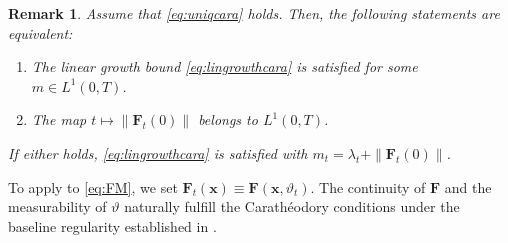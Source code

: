 \documentclass[twoside,11pt]{article}
\theoremstyle{plain}
\newtheorem{lemma}[theorem]{Lemma}
\newtheorem{remark}[theorem]{Remark}
\newcommand{\diff}{\mathrm{d}}
\newcommand{\bfF}{\mathbf{F}}
\newcommand{\bfx}{\mathbf{x}}
\begin{document}
\begin{remark}\label{rema2}
Assume that \eqref{eq:uniqcara} holds. Then, the following statements are equivalent: 
\begin{enumerate}
    \item The linear growth bound \eqref{eq:lingrowthcara} is satisfied for some $m \in L^1(0,T)$.
    \item The map $t\mapsto\|\mathbf{F}_t(0)\|$ belongs to $L^1(0,T)$.  
\end{enumerate}
If either holds, \eqref{eq:lingrowthcara} is satisfied with $m_t=\lambda_t+\|\mathbf{F}_t(0)\|$.
\end{remark} 

To apply  to \eqref{eq:FM}, we set $\mathbf{F}_t(\bfx)\equiv\bfF(\bfx,\vartheta_t)$. The continuity of $\bfF$ and the measurability of $\vartheta$ naturally fulfill the Carathéodory conditions under the baseline regularity established in .

\end{document}
